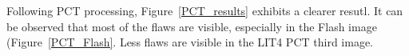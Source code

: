 \documentclass[]{spie}  %
\begin{document}
Following PCT processing, Figure~\ref{PCT_results} exhibits a clearer resutl. It can be observed that most of the flaws are visible, especially in the Flash image (Figure~\ref{PCT_Flash}. Less flaws are visible in the LIT4 PCT third image.
\begin{figure}[ht]
    \centering
    \hspace{10pt}
    \hspace{10pt}
\end{figure}
\end{document}
